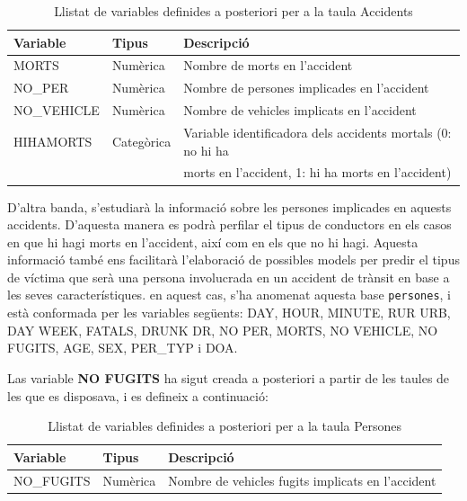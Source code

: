 \documentclass[12pt,longbibliography]{article}
\theoremstyle{definition}
\theoremstyle{remark}
\begin{document}
\begin{table}[H]
\centering
\begin{tabular}{|l|l|l|}
\hline
\textbf{Variable} & \textbf{Tipus} & \textbf{Descripció}                         \\ \hline
MORTS             & Numèrica       & Nombre de morts en l'accident               \\
NO\_PER           & Numèrica       & Nombre de persones implicades en l'accident \\
NO\_VEHICLE       & Numèrica       & Nombre de vehicles implicats en l'accident  \\
HIHAMORTS & Categòrica & Variable identificadora dels accidents mortals (0: no hi ha \\
                       &                   &  morts en l'accident, 1: hi ha morts en l'accident) \\ \hline
\end{tabular}
\caption{Llistat de variables definides a posteriori per a la taula Accidents}
\end{table}

D'altra banda, s'estudiarà la informació sobre les persones implicades en aquests accidents. D'aquesta manera es podrà perfilar el tipus de conductors en els casos en que hi hagi morts en l'accident, així com en els que no hi hagi. Aquesta informació també ens facilitarà l'elaboració de possibles models per predir el tipus de víctima que serà una persona involucrada en un accident de trànsit en base a les seves característiques. en aquest cas, s'ha anomenat aquesta base \texttt{persones}, i està conformada per les variables següents: DAY, HOUR, MINUTE, RUR URB, DAY WEEK, FATALS, DRUNK DR, NO PER, MORTS, NO VEHICLE, NO FUGITS, AGE, SEX, PER\_TYP i DOA.


Las variable \textbf{NO FUGITS} ha sigut creada a posteriori a partir de les taules de les que es disposava, i es defineix a continuació:


\begin{table}[H]
\centering
\begin{tabular}{|l|l|l|}
\hline
\textbf{Variable} & \textbf{Tipus} & \textbf{Descripció}                         \\ \hline
NO\_FUGITS     &   Numèrica    &  Nombre de vehicles fugits implicats en l'accident \\ \hline
\end{tabular}
\caption{Llistat de variables definides a posteriori per a la taula Persones}
\end{table}
\end{document}
